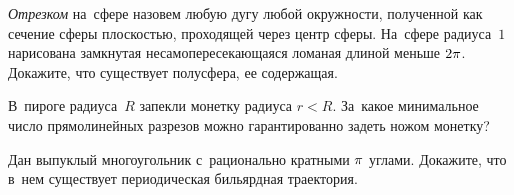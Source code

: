 \begin{problems}

\item
\emph{Отрезком} на~сфере назовем любую дугу любой окружности, полученной как
сечение сферы плоскостью, проходящей через центр сферы.
На~сфере радиуса~$1$ нарисована замкнутая несамопересекающаяся ломаная длиной
меньше $2 \pi$.
Докажите, что существует полусфера, ее содержащая.

\item
В~пироге радиуса~$R$ запекли монетку радиуса $r < R$.
За~какое минимальное число прямолинейных разрезов можно гарантированно задеть
ножом монетку?

\item
Дан выпуклый многоугольник с~рационально кратными $\pi$ углами.
Докажите, что в~нем существует периодическая бильярдная траектория.

\end{problems}

\endgroup %

